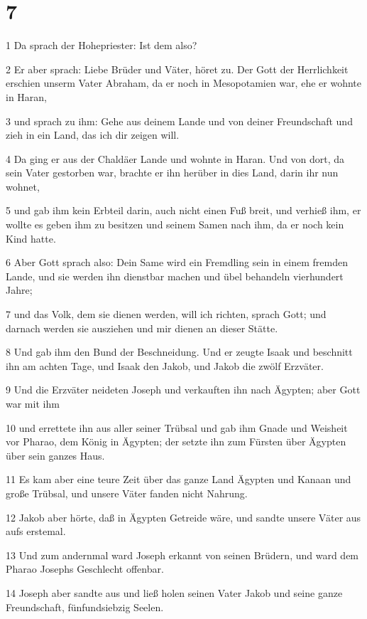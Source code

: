 \chapter{7}

\par 1 Da sprach der Hohepriester: Ist dem also?
\par 2 Er aber sprach: Liebe Brüder und Väter, höret zu. Der Gott der Herrlichkeit erschien unserm Vater Abraham, da er noch in Mesopotamien war, ehe er wohnte in Haran,
\par 3 und sprach zu ihm: Gehe aus deinem Lande und von deiner Freundschaft und zieh in ein Land, das ich dir zeigen will.
\par 4 Da ging er aus der Chaldäer Lande und wohnte in Haran. Und von dort, da sein Vater gestorben war, brachte er ihn herüber in dies Land, darin ihr nun wohnet,
\par 5 und gab ihm kein Erbteil darin, auch nicht einen Fuß breit, und verhieß ihm, er wollte es geben ihm zu besitzen und seinem Samen nach ihm, da er noch kein Kind hatte.
\par 6 Aber Gott sprach also: Dein Same wird ein Fremdling sein in einem fremden Lande, und sie werden ihn dienstbar machen und übel behandeln vierhundert Jahre;
\par 7 und das Volk, dem sie dienen werden, will ich richten, sprach Gott; und darnach werden sie ausziehen und mir dienen an dieser Stätte.
\par 8 Und gab ihm den Bund der Beschneidung. Und er zeugte Isaak und beschnitt ihn am achten Tage, und Isaak den Jakob, und Jakob die zwölf Erzväter.
\par 9 Und die Erzväter neideten Joseph und verkauften ihn nach Ägypten; aber Gott war mit ihm
\par 10 und errettete ihn aus aller seiner Trübsal und gab ihm Gnade und Weisheit vor Pharao, dem König in Ägypten; der setzte ihn zum Fürsten über Ägypten über sein ganzes Haus.
\par 11 Es kam aber eine teure Zeit über das ganze Land Ägypten und Kanaan und große Trübsal, und unsere Väter fanden nicht Nahrung.
\par 12 Jakob aber hörte, daß in Ägypten Getreide wäre, und sandte unsere Väter aus aufs erstemal.
\par 13 Und zum andernmal ward Joseph erkannt von seinen Brüdern, und ward dem Pharao Josephs Geschlecht offenbar.
\par 14 Joseph aber sandte aus und ließ holen seinen Vater Jakob und seine ganze Freundschaft, fünfundsiebzig Seelen.
